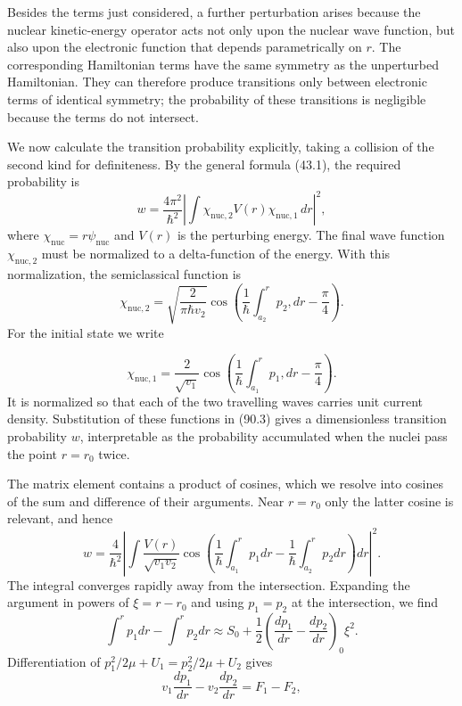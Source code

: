




Besides the terms just considered, a further perturbation arises because the nuclear kinetic-energy operator acts not only upon the nuclear wave function, but also upon the electronic function that depends parametrically on $r$. The corresponding Hamiltonian terms have the same symmetry as the unperturbed Hamiltonian. They can therefore produce transitions only between electronic terms of identical symmetry; the probability of these transitions is negligible because the terms do not intersect.

We now calculate the transition probability explicitly, taking a collision of the second kind for definiteness. By the general formula (43.1), the required probability is
\begin{equation}w=\frac{4\pi^2}{\hbar^2}\left|\int\chi_{\text{nuc},2}V(r)\chi_{\text{nuc},1}\,dr\right|^2,\tag{90.3}\end{equation}
where $\chi_{\text{nuc}}=r\psi_{\text{nuc}}$ and $V(r)$ is the perturbing energy. The final wave function $\chi_{\text{nuc},2}$ must be normalized to a delta-function of the energy. With this normalization, the semiclassical function is
\begin{equation}\chi_{\text{nuc},2}=\sqrt{\frac2{\pi\hbar v_2}}\cos\left(\frac1\hbar\int_{a_2}^r p_2,dr-\frac\pi4\right).\tag{90.4}\end{equation}
For the initial state we write

\begin{equation}\chi_{\text{nuc},1}=\frac2{\sqrt{v_1}}\cos\left(\frac1\hbar\int_{a_1}^r p_1,dr-\frac\pi4\right).\tag{90.5}\end{equation}
It is normalized so that each of the two travelling waves carries unit current density. Substitution of these functions in (90.3) gives a dimensionless transition probability $w$, interpretable as the probability accumulated when the nuclei pass the point $r=r_0$ twice.

The matrix element contains a product of cosines, which we resolve into cosines of the sum and difference of their arguments. Near $r=r_0$ only the latter cosine is relevant, and hence
\[
w=\frac4{\hbar^2}\left|\int\frac{V(r)}{\sqrt{v_1v_2}}\cos\left(\frac1\hbar\int_{a_1}^r p_1dr-\frac1\hbar\int_{a_2}^r p_2dr\right)dr\right|^2.
\]
The integral converges rapidly away from the intersection. Expanding the argument in powers of $\xi=r-r_0$ and using $p_1=p_2$ at the intersection, we find
\[
\int^r p_1dr-\int^r p_2dr\approx S_0+\frac12\left(\frac{dp_1}{dr}-\frac{dp_2}{dr}\right)_0\xi^2.
\]
Differentiation of $p_1^2/2\mu+U_1=p_2^2/2\mu+U_2$ gives
\[
v_1\frac{dp_1}{dr}-v_2\frac{dp_2}{dr}=F_1-F_2,
\]

